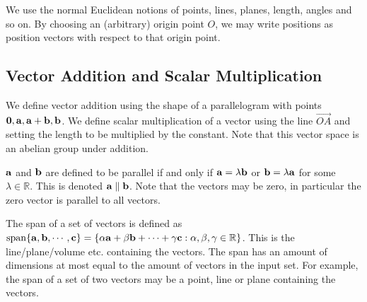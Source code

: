 We use the normal Euclidean notions of points, lines, planes, length, angles and so on.
By choosing an (arbitrary) origin point \(O\), we may write positions as position vectors with respect to that origin point.

\subsection{Vector Addition and Scalar Multiplication}
We define vector addition using the shape of a parallelogram with points \(\vb 0, \vb a, \vb a + \vb b, \vb b\).
We define scalar multiplication of a vector using the line \(\overrightarrow{OA}\) and setting the length to be multiplied by the constant.
Note that this vector space is an abelian group under addition.
\begin{definition}
	\(\vb a\) and \(\vb b\) are defined to be parallel if and only if \(\vb a = \lambda \vb b\) or \(\vb b = \lambda \vb a\) for some \(\lambda \in \mathbb R\).
	This is denoted \(\vb a \parallel \vb b\).
	Note that the vectors may be zero, in particular the zero vector is parallel to all vectors.
\end{definition}
\begin{definition}
	The span of a set of vectors is defined as \(\operatorname{span} \{\vb a, \vb b, \cdots, \vb c\} = \{ \alpha \vb a + \beta \vb b + \cdots + \gamma \vb c: \alpha, \beta, \gamma \in \mathbb R \}\).
	This is the line/plane/volume etc.
	containing the vectors.
	The span has an amount of dimensions at most equal to the amount of vectors in the input set.
	For example, the span of a set of two vectors may be a point, line or plane containing the vectors.
\end{definition}

